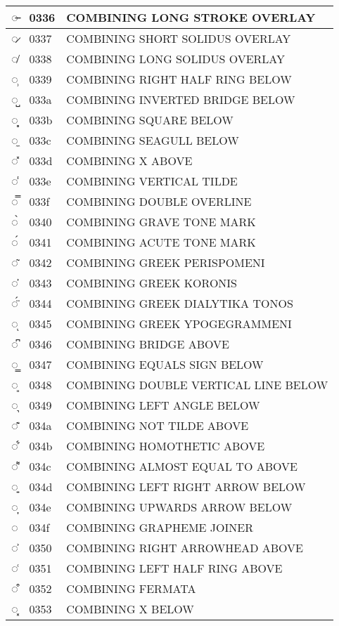 \documentclass[12pt,letterpaper,openany]{book}
\begin{document}
\begin{center}
\begin{supertabular}{|m{0.25in}|m{0.5in}|m{4in}|}
◌̶ & 0336 & COMBINING LONG STROKE OVERLAY\\\hline
◌̷ & 0337 & COMBINING SHORT SOLIDUS OVERLAY\\\hline
◌̸ & 0338 & COMBINING LONG SOLIDUS OVERLAY\\\hline
◌̹ & 0339 & COMBINING RIGHT HALF RING BELOW\\\hline
◌̺ & 033a & COMBINING INVERTED BRIDGE BELOW\\\hline
◌̻ & 033b & COMBINING SQUARE BELOW\\\hline
◌̼ & 033c & COMBINING SEAGULL BELOW\\\hline
◌̽ & 033d & COMBINING X ABOVE\\\hline
◌̾ & 033e & COMBINING VERTICAL TILDE\\\hline
◌̿ & 033f & COMBINING DOUBLE OVERLINE\\\hline
◌̀ & 0340 & COMBINING GRAVE TONE MARK\\\hline
◌́ & 0341 & COMBINING ACUTE TONE MARK\\\hline
◌͂ & 0342 & COMBINING GREEK PERISPOMENI\\\hline
◌̓ & 0343 & COMBINING GREEK KORONIS\\\hline
◌̈́ & 0344 & COMBINING GREEK DIALYTIKA TONOS\\\hline
◌ͅ & 0345 & COMBINING GREEK YPOGEGRAMMENI\\\hline
◌͆ & 0346 & COMBINING BRIDGE ABOVE\\\hline
◌͇ & 0347 & COMBINING EQUALS SIGN BELOW\\\hline
◌͈ & 0348 & COMBINING DOUBLE VERTICAL LINE BELOW\\\hline
◌͉ & 0349 & COMBINING LEFT ANGLE BELOW\\\hline
◌͊ & 034a & COMBINING NOT TILDE ABOVE\\\hline
◌͋ & 034b & COMBINING HOMOTHETIC ABOVE\\\hline
◌͌ & 034c & COMBINING ALMOST EQUAL TO ABOVE\\\hline
◌͍ & 034d & COMBINING LEFT RIGHT ARROW BELOW\\\hline
◌͎ & 034e & COMBINING UPWARDS ARROW BELOW\\\hline
◌͏ & 034f & COMBINING GRAPHEME JOINER\\\hline
◌͐ & 0350 & COMBINING RIGHT ARROWHEAD ABOVE\\\hline
◌͑ & 0351 & COMBINING LEFT HALF RING ABOVE\\\hline
◌͒ & 0352 & COMBINING FERMATA\\\hline
◌͓ & 0353 & COMBINING X BELOW\\\hline

\end{supertabular}
\end{center}
\end{document}
